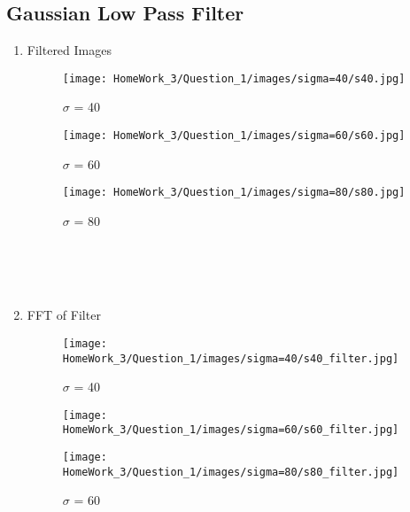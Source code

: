 \documentclass{article}
\begin{document}
\begin{enumerate}
\subsection*{Gaussian Low Pass Filter}
\begin{enumerate}
    \item Filtered Images
        \begin{figure}[!h]
            \centering
            \begin{minipage}{0.3\textwidth}
                \texttt{[image: HomeWork\_3/Question\_1/images/sigma=40/s40.jpg]}
                \caption{$\sigma$ = 40}
            \end{minipage}
            \hfill
                \centering
            \begin{minipage}{0.3\textwidth}
                \texttt{[image: HomeWork\_3/Question\_1/images/sigma=60/s60.jpg]}
                \caption{$\sigma$ = 60}
            \end{minipage}
            \hfill
                \centering
            \begin{minipage}{0.3\textwidth}
                \texttt{[image: HomeWork\_3/Question\_1/images/sigma=80/s80.jpg]}
                \caption{$\sigma$ = 80}
            \end{minipage}
            \hfill
        \end{figure}
        \\\\\\
    \item FFT of Filter
        \begin{figure}[!h]
            \centering
            \begin{minipage}{0.3\textwidth}
                \texttt{[image: HomeWork\_3/Question\_1/images/sigma=40/s40\_filter.jpg]}
                \caption{$\sigma$ = 40}
            \end{minipage}
            \hfill
                \centering
            \begin{minipage}{0.3\textwidth}
                \texttt{[image: HomeWork\_3/Question\_1/images/sigma=60/s60\_filter.jpg]}
                \caption{$\sigma$ = 60}
            \end{minipage}
            \hfill
                \centering
            \begin{minipage}{0.3\textwidth}
                \texttt{[image: HomeWork\_3/Question\_1/images/sigma=80/s80\_filter.jpg]}

\end{minipage}
\end{figure}
\end{enumerate}
\end{enumerate}
\end{document}
